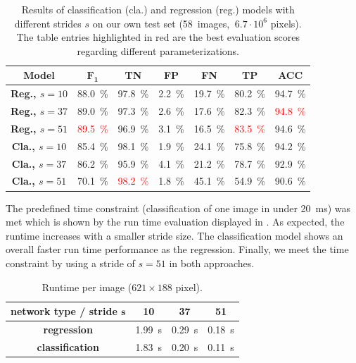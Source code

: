 \begin{table}[tbp]
    \centering
    \begin{tabular}{c|cccccc}
        \toprule
        \textbf{Model} & $\mathbf{F_1}$ & \textbf{TN} & \textbf{FP} & \textbf{FN} & \textbf{TP} & \textbf{ACC} \\
        \midrule
        \textbf{Reg., $s=10$} & \SI{88.0}{\percent} & \SI{97.8}{\percent} & \SI{2.2}{\percent}& \SI{19.7}{\percent}& \SI{80.2}{\percent}& \SI{94.7}{\percent}\\
        \textbf{Reg., $s=37$} & \SI{89.0}{\percent}& \SI{97.3}{\percent}& \SI{2.6}{\percent}& \SI{17.6}{\percent}& \SI{82.3}{\percent} &  \textcolor{red}{\SI{94.8}{\percent}}\\
        \textbf{Reg., $s=51$} & \textcolor{red}{\SI{89.5}{\percent}} &\SI{96.9}{\percent} & \SI{3.1}{\percent} & \SI{16.5}{\percent}& \textcolor{red}{\SI{83.5}{\percent}} & \SI{94.6}{\percent}\\
        \midrule
        \textbf{Cla., $s=10$} & \SI{85.4}{\percent} & \SI{98.1}{\percent}& \SI{1.9}{\percent}&\SI{24.1}{\percent} & \SI{75.8}{\percent} & \SI{94.2}{\percent}\\
        \textbf{Cla., $s=37$} & \SI{86.2}{\percent}& \SI{95.9}{\percent} & \SI{4.1}{\percent} & \SI{21.2}{\percent} & \SI{78.7}{\percent} & \SI{92.9}{\percent}\\
        \textbf{Cla., $s=51$} & \SI{70.1}{\percent} & \textcolor{red}{\SI{98.2}{\percent}} & \SI{1.8}{\percent} & \SI{45.1}{\percent} & \SI{54.9}{\percent} & \SI{90.6}{\percent}\\
        \bottomrule
    \end{tabular}
    \caption{Results of classification (cla.) and regression (reg.) models
             with different strides $s$ on our own test set (58~images,
             $ ~6.7 \cdot 10^6$ pixels). The table entries highlighted in
             red are the best evaluation scores regarding different parameterizations.}%
\label{tab:ownapproach}
\end{table}

The predefined time constraint (classification of one image in under
\SI{20}{\milli\second}) was met which is shown by the run time evaluation
displayed in . As expected, the runtime increases with a
smaller stride size. The classification model shows an overall faster run time
performance as the regression. Finally, we meet the time constraint by using a
stride of $s=51$ in both approaches.

\begin{table}[tbp]
    \centering
    \begin{tabular}{c|ccc}
        \toprule
        \textbf{network type / stride $\bm{s}$} & 10 & 37 & 51 \\
        \midrule
        \textbf{regression}     & \SI{1.99}{\second} & \SI{0.29}{\second} & \SI{0.18}{\second} \\
        \textbf{classification} & \SI{1.83}{\second} & \SI{0.20}{\second}  & \SI{0.11}{\second}\\
        \bottomrule
    \end{tabular}
    \caption{Runtime per image ($621 \times 188$ pixel).}%
\label{tab:runtime}
\end{table}

